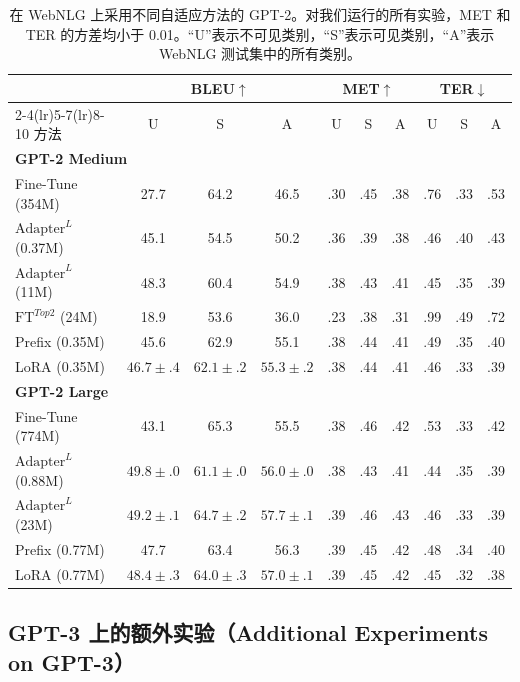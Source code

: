 \documentclass[11pt,UTF8,fontset=fandol]{ctexart}
\begin{document}
\begin{table}[H]\centering
\caption{在 WebNLG 上采用不同自适应方法的 GPT-2。对我们运行的所有实验，MET 和 TER 的方差均小于 0.01。“U”表示不可见类别，“S”表示可见类别，“A”表示 WebNLG 测试集中的所有类别。}
\label{tab:14}
\small
\setlength{\tabcolsep}{4pt}
\begin{tabular}{lccccccccc}
\toprule
 & \multicolumn{3}{c}{BLEU$\uparrow$} & \multicolumn{3}{c}{MET$\uparrow$} & \multicolumn{3}{c}{TER$\downarrow$} \\
\cmidrule(lr){2-4}\cmidrule(lr){5-7}\cmidrule(lr){8-10}
方法 & U & S & A & U & S & A & U & S & A \\
\midrule
\multicolumn{10}{l}{\textbf{GPT-2 Medium}} \\
Fine-Tune (354M) & 27.7 & 64.2 & 46.5 & .30 & .45 & .38 & .76 & .33 & .53 \\
$\text{Adapter}^L$ (0.37M) & 45.1 & 54.5 & 50.2 & .36 & .39 & .38 & .46 & .40 & .43 \\
$\text{Adapter}^L$ (11M) & 48.3 & 60.4 & 54.9 & .38 & .43 & .41 & .45 & .35 & .39 \\
$\text{FT}^{Top2}$ (24M) & 18.9 & 53.6 & 36.0 & .23 & .38 & .31 & .99 & .49 & .72 \\
Prefix (0.35M) & 45.6 & 62.9 & 55.1 & .38 & .44 & .41 & .49 & .35 & .40 \\
LoRA (0.35M) & $46.7\pm.4$ & $62.1\pm.2$ & $55.3\pm.2$ & .38 & .44 & .41 & .46 & .33 & .39 \\
\midrule
\multicolumn{10}{l}{\textbf{GPT-2 Large}} \\
Fine-Tune (774M) & 43.1 & 65.3 & 55.5 & .38 & .46 & .42 & .53 & .33 & .42 \\
$\text{Adapter}^L$ (0.88M) & $49.8\pm.0$ & $61.1\pm.0$ & $56.0\pm.0$ & .38 & .43 & .41 & .44 & .35 & .39 \\
$\text{Adapter}^L$ (23M) & $49.2\pm.1$ & $64.7\pm.2$ & $57.7\pm.1$ & .39 & .46 & .43 & .46 & .33 & .39 \\
Prefix (0.77M) & 47.7 & 63.4 & 56.3 & .39 & .45 & .42 & .48 & .34 & .40 \\
LoRA (0.77M) & $48.4\pm.3$ & $64.0\pm.3$ & $57.0\pm.1$ & .39 & .45 & .42 & .45 & .32 & .38 \\
\bottomrule
\end{tabular}
\end{table}

\subsection{GPT-3 上的额外实验（Additional Experiments on GPT-3）}
\end{document}
